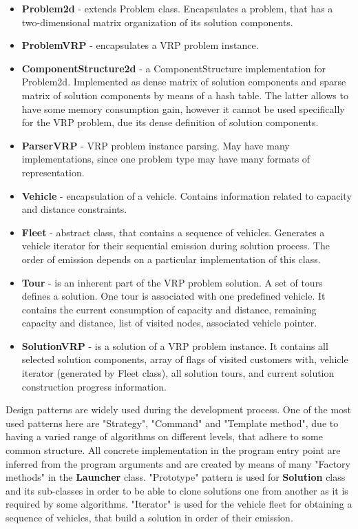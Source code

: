 \documentclass[11pt,a4paper,oneside]{book}
\begin{document}
\begin{itemize}
\item \textbf{Problem2d} - extends Problem class. Encapsulates a problem, that has a two-dimensional matrix organization of its solution components.

\item \textbf{ProblemVRP} - encapsulates a VRP problem instance.

\item \textbf{ComponentStructure2d} - a ComponentStructure implementation for Problem2d. Implemented as dense matrix of solution components and sparse matrix of solution components by means of a hash table. The latter allows to have some memory consumption gain, however it cannot be used specifically for the VRP problem, due its dense definition of solution components.

\item \textbf{ParserVRP} - VRP problem instance parsing. May have many implementations, since one problem type may have many formats of representation.

\item \textbf{Vehicle} - encapsulation of a vehicle. Contains information related to capacity and distance constraints.

\item \textbf{Fleet} - abstract class, that contains a sequence of vehicles. Generates a vehicle iterator for their sequential emission during solution process. The order of emission depends on a particular implementation of this class.

\item \textbf{Tour} - is an inherent part of the VRP problem solution. A set of tours defines a solution. One tour is associated with one predefined vehicle. It contains the current consumption of capacity and distance, remaining capacity and distance, list of visited nodes, associated vehicle pointer.

\item \textbf{SolutionVRP} - is a solution of a VRP problem instance. It contains all selected solution components, array of flags of visited customers with, vehicle iterator (generated by Fleet class), all solution tours, and current solution construction progress information.

\end{itemize}



Design patterns are widely used during the development process. One of the most used patterns here are "Strategy", "Command" and "Template method", due to having a varied range of algorithms on different levels, that adhere to some common structure. All concrete implementation in the program entry point are inferred from the program arguments and are created by means of many "Factory methods" in the \textbf{Launcher} class. "Prototype" pattern is used for \textbf{Solution} class and its sub-classes in order to be able to clone solutions one from another as it is required by some algorithms. "Iterator" is used for the vehicle fleet for obtaining a sequence of vehicles, that build a solution in order of their emission.
\end{document}
